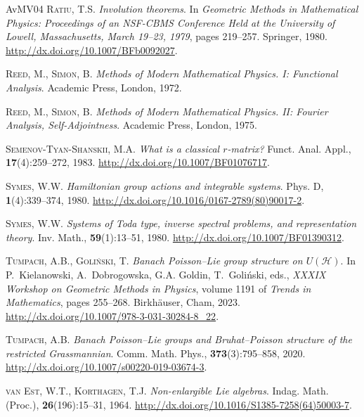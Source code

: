 \documentclass[a4paper,12pt,reqno]{amsart}%
\theoremstyle{definition}
\theoremstyle{remark}
\numberwithin{theorem}{section}
\numberwithin{equation}{section}
\newcommand{\1}{{\bf 1}}
\begin{document}
\begin{thebibliography}{AvMV04}
\textsc{Ratiu, T.S.}
\newblock \emph{Involution theorems}.
\newblock In \emph{Geometric Methods in Mathematical Physics: Proceedings of an
  NSF-CBMS Conference Held at the University of Lowell, Massachusetts, March
  19--23, 1979}, pages 219--257. Springer, 1980.
\newblock \urlprefix\url{http://dx.doi.org/10.1007/BFb0092027}.

\textsc{Reed, M.}, \textsc{Simon, B.}
\newblock \emph{Methods of Modern Mathematical Physics. {I}: Functional
  Analysis}.
\newblock Academic Press, London, 1972.

\textsc{Reed, M.}, \textsc{Simon, B.}
\newblock \emph{Methods of Modern Mathematical Physics. {II}: {F}ourier
  Analysis, Self-Adjointness}.
\newblock Academic Press, London, 1975.

\textsc{Semenov-Tyan-Shanskii, M.A.}
\newblock \emph{What is a classical $r$-matrix?}
\newblock Funct. Anal. Appl., \textbf{17}(4):259--272, 1983.
\newblock \urlprefix\url{http://dx.doi.org/10.1007/BF01076717}.

\textsc{Symes, W.W.}
\newblock \emph{Hamiltonian group actions and integrable systems}.
\newblock Phys. D, \textbf{1}(4):339--374, 1980.
\newblock \urlprefix\url{http://dx.doi.org/10.1016/0167-2789(80)90017-2}.

\textsc{Symes, W.W.}
\newblock \emph{Systems of {T}oda type, inverse spectral problems, and
  representation theory}.
\newblock Inv. Math., \textbf{59}(1):13--51, 1980.
\newblock \urlprefix\url{http://dx.doi.org/10.1007/BF01390312}.

\textsc{Tumpach, A.B.}, \textsc{Goliński, T.}
\newblock \emph{Banach {P}oisson--{L}ie group structure on ${U}(\mathcal{H})$}.
\newblock In P.~Kielanowski, A.~Dobrogowska, G.A. Goldin, T.~Goliński, eds.,
  \emph{XXXIX Workshop on Geometric Methods in Physics}, volume 1191 of
  \emph{Trends in Mathematics}, pages 255--268. Birkh{\"a}user, Cham, 2023.
\newblock \urlprefix\url{http://dx.doi.org/10.1007/978-3-031-30284-8_22}.

\textsc{Tumpach, A.B.}
\newblock \emph{Banach {P}oisson--{L}ie groups and {B}ruhat--{P}oisson
  structure of the restricted {G}rassmannian}.
\newblock Comm. Math. Phys., \textbf{373}(3):795--858, 2020.
\newblock \urlprefix\url{http://dx.doi.org/10.1007/s00220-019-03674-3}.

\textsc{van Est, W.T.}, \textsc{Korthagen, T.J.}
\newblock \emph{Non-enlargible {L}ie algebras}.
\newblock Indag. Math. (Proc.), \textbf{26}(196):15--31, 1964.
\newblock \urlprefix\url{http://dx.doi.org/10.1016/S1385-7258(64)50003-7}.

\end{thebibliography}
\end{document}
